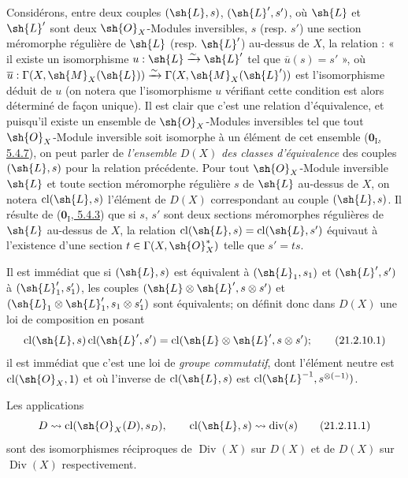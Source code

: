 \begin{env}[21.2.10]
\label{IV.21.2.10}
Considérons, entre deux couples $(\sh{L},s)$, $(\sh{L}',s')$, où $\sh{L}$ et $\sh{L}'$ sont deux $\sh{O}_X$-Modules inversibles, $s$ (resp. $s'$) une section méromorphe régulière de $\sh{L}$ (resp. $\sh{L}'$) au-dessus de $X$, la relation : « il existe un isomorphisme $u:\sh{L}\xrightarrow{\sim}\sh{L}'$ tel que $\overline{u}(s)=s'$ », où $\overline{u}:\Gamma(X,\sh{M}_X(\sh{L}))\xrightarrow{\sim}\Gamma(X,\sh{M}_X(\sh{L}'))$ est l'isomorphisme déduit de $u$ (on notera que l'isomorphisme $u$ vérifiant cette condition est alors déterminé de façon unique).
Il est clair que c'est une relation d'équivalence, et puisqu'il existe un ensemble de $\sh{O}_X$-Modules inversibles tel que tout $\sh{O}_X$-Module inversible soit isomorphe à un élément de cet ensemble (\hyperref[0.5.4.7]{$\mathbf{0}_{\mathrm I}$, 5.4.7}), on peut parler de \emph{l'ensemble} $D(X)$ \emph{des classes d'équivalence} des couples $(\sh{L},s)$ pour la relation précédente.
Pour tout $\sh{O}_X$-Module inversible $\sh{L}$ et toute section
méromorphe régulière $s$ de $\sh{L}$ au-dessus de $X$, on notera $\operatorname{cl}(\sh{L},s)$ l'élément de $D(X)$ correspondant au couple $(\sh{L},s)$.
Il résulte de (\hyperref[0.5.4.3]{$\mathbf{0}_{\mathrm I}$, 5.4.3}) que si $s$, $s'$ sont deux sections méromorphes régulières de $\sh{L}$ au-dessus de $X$, la relation $\operatorname{cl}(\sh{L},s)=\operatorname{cl}(\sh{L},s')$ équivaut à l'existence d'une section $t\in\Gamma(X,\sh{O}_X^*)$ telle que $s'=ts$.

Il est immédiat que si $(\sh{L},s)$ est équivalent à $(\sh{L}_1,s_1)$ et $(\sh{L}',s')$ à $(\sh{L}_1',s_1')$, les couples $(\sh{L}\otimes\sh{L}',s\otimes s')$ et $(\sh{L}_1\otimes\sh{L}_1',s_1\otimes s_1')$ sont équivalents;
on définit donc dans $D(X)$ une loi de composition en posant
\[
\label{IV.21.2.10.1}
  \operatorname{cl}(\sh{L},s)\operatorname{cl}(\sh{L}',s')=\operatorname{cl}(\sh{L}\otimes\sh{L}',s\otimes s');
  \tag{21.2.10.1}
\]
il est immédiat que c'est une loi de \emph{groupe commutatif}, dont l'élément neutre est $\operatorname{cl}(\sh{O}_X,1)$ et où l'inverse de $\operatorname{cl}(\sh{L},s)$ est $\operatorname{cl}(\sh{L}^{-1},s^{\otimes(-1)})$.
\end{env}

\begin{proposition}[21.2.11]
Les applications
\[
\label{IV.21.2.11.1}
  D\leadsto\operatorname{cl}(\sh{O}_X(D),s_D),\qquad \operatorname{cl}(\sh{L},s)\leadsto\operatorname{div}(s)
  \tag{21.2.11.1}
\]
sont des isomorphismes réciproques de $\operatorname{Div}(X)$ sur $D(X)$ et de $D(X)$ sur $\operatorname{Div}(X)$ respectivement.
\end{proposition}

